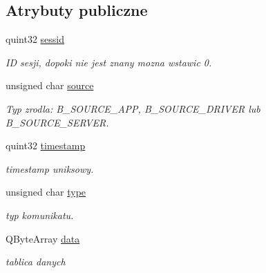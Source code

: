 \subsection*{Atrybuty publiczne}
\begin{CompactItemize}
\item 
\hypertarget{class_b_datagram_d77fa0aefd216480abe999e24f28dba6}{
quint32 \hyperlink{class_b_datagram_d77fa0aefd216480abe999e24f28dba6}{sessid}}
\label{class_b_datagram_d77fa0aefd216480abe999e24f28dba6}

\begin{CompactList}\small\item\em ID sesji, dopoki nie jest znany mozna wstawic 0. \item\end{CompactList}\item 
\hypertarget{class_b_datagram_2e70a774059cddc0a5715850370bc1d9}{
unsigned char \hyperlink{class_b_datagram_2e70a774059cddc0a5715850370bc1d9}{source}}
\label{class_b_datagram_2e70a774059cddc0a5715850370bc1d9}

\begin{CompactList}\small\item\em Typ zrodla: B\_\-SOURCE\_\-APP, B\_\-SOURCE\_\-DRIVER lub B\_\-SOURCE\_\-SERVER. \item\end{CompactList}\item 
\hypertarget{class_b_datagram_1a0d1b7430e0e9d95cd9248b3499904f}{
quint32 \hyperlink{class_b_datagram_1a0d1b7430e0e9d95cd9248b3499904f}{timestamp}}
\label{class_b_datagram_1a0d1b7430e0e9d95cd9248b3499904f}

\begin{CompactList}\small\item\em timestamp uniksowy. \item\end{CompactList}\item 
\hypertarget{class_b_datagram_3ae0b66921f9b51864beb65e5e03eeb9}{
unsigned char \hyperlink{class_b_datagram_3ae0b66921f9b51864beb65e5e03eeb9}{type}}
\label{class_b_datagram_3ae0b66921f9b51864beb65e5e03eeb9}

\begin{CompactList}\small\item\em typ komunikatu. \item\end{CompactList}\item 
\hypertarget{class_b_datagram_98d72aa468643e0179bbc02d6dbf388e}{
QByteArray \hyperlink{class_b_datagram_98d72aa468643e0179bbc02d6dbf388e}{data}}
\label{class_b_datagram_98d72aa468643e0179bbc02d6dbf388e}

\begin{CompactList}\small\item\em tablica danych \item\end{CompactList}\end{CompactItemize}


